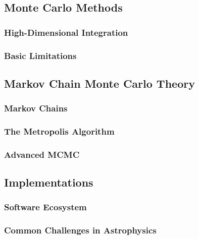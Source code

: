 \documentclass[preprint,longauthor]{aastex631}
\begin{document}
\subsection{Monte Carlo Methods}
\subsubsection{High-Dimensional Integration}
\subsubsection{Basic Limitations}

\subsection{Markov Chain Monte Carlo Theory}
\subsubsection{Markov Chains}
\subsubsection{The Metropolis Algorithm}
\subsubsection{Advanced MCMC}

\subsection{Implementations}
\subsubsection{Software Ecosystem}
\subsubsection{Common Challenges in Astrophysics}




\end{document}
